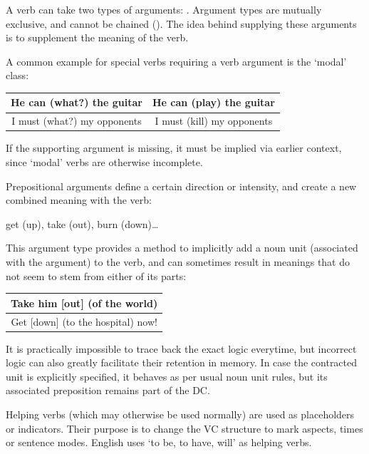 A verb can take two types of arguments: . Argument  types are mutually exclusive, and cannot be chained (). The idea behind supplying these arguments is to supplement the meaning of the verb. 

A common example for special verbs requiring a verb argument is the  `modal' class:
\begin{example}
    \begin{tabular}{c|c}
        He can (what?) the guitar & He can (play) the guitar\\\hline
        I must (what?) my opponents & I must (kill) my opponents
    \end{tabular}
\end{example}
If the supporting argument is missing, it must be implied via earlier context, since  `modal' verbs are otherwise incomplete.

Prepositional arguments define a certain direction or intensity, and create a new combined meaning with the verb: 
\begin{example}
get (up), take (out), burn (down)\ldots
\end{example}
This argument type provides a method to implicitly add a noun unit (associated with the argument) to the verb, and can sometimes result in meanings that do not seem to stem from either of its parts:
\begin{example}
    \begin{tabular}{c}
        Take him  [out] (of the world)\\\hline Get [down] (to the hospital) now!
    \end{tabular}
\end{example}
It is practically impossible to trace back the exact logic everytime, but  incorrect  logic can also greatly facilitate their retention in memory. In case the contracted unit is explicitly specified, it behaves as per  usual  noun unit rules, but  its associated preposition remains part of the DC.

Helping verbs (which may otherwise be used normally) are  used as placeholders or indicators. Their  purpose is to change the VC structure to mark aspects, times or sentence modes.  English uses `to be, to have, will' as helping verbs. 

